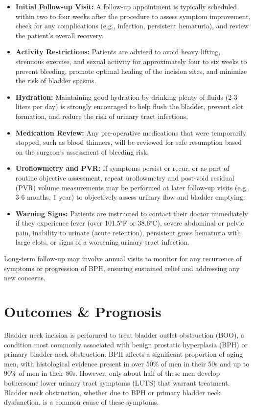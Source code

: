 \begin{itemize}
  \item \textbf{Initial Follow-up Visit:} A follow-up appointment is typically scheduled within two to four weeks after the procedure to assess symptom improvement, check for any complications (e.g., infection, persistent hematuria), and review the patient's overall recovery.
  
  \item \textbf{Activity Restrictions:} Patients are advised to avoid heavy lifting, strenuous exercise, and sexual activity for approximately four to six weeks to prevent bleeding, promote optimal healing of the incision sites, and minimize the risk of bladder spasms.
  
  \item \textbf{Hydration:} Maintaining good hydration by drinking plenty of fluids (2-3 liters per day) is strongly encouraged to help flush the bladder, prevent clot formation, and reduce the risk of urinary tract infections.
  
  \item \textbf{Medication Review:} Any pre-operative medications that were temporarily stopped, such as blood thinners, will be reviewed for safe resumption based on the surgeon's assessment of bleeding risk.
  
  \item \textbf{Uroflowmetry and PVR:} If symptoms persist or recur, or as part of routine objective assessment, repeat uroflowmetry and post-void residual (PVR) volume measurements may be performed at later follow-up visits (e.g., 3-6 months, 1 year) to objectively assess urinary flow and bladder emptying.
  
  \item \textbf{Warning Signs:} Patients are instructed to contact their doctor immediately if they experience fever (over 101.5$^{\circ}$F or 38.6$^{\circ}$C), severe abdominal or pelvic pain, inability to urinate (acute retention), persistent gross hematuria with large clots, or signs of a worsening urinary tract infection.
\end{itemize}

Long-term follow-up may involve annual visits to monitor for any recurrence of symptoms or progression of BPH, ensuring sustained relief and addressing any new concerns.

\section*{Outcomes \& Prognosis}
Bladder neck incision is performed to treat bladder outlet obstruction (BOO), a condition most commonly associated with benign prostatic hyperplasia (BPH) or primary bladder neck obstruction. BPH affects a significant proportion of aging men, with histological evidence present in over 50\% of men in their 50s and up to 90\% of men in their 80s. However, only about half of these men develop bothersome lower urinary tract symptoms (LUTS) that warrant treatment. Bladder neck obstruction, whether due to BPH or primary bladder neck dysfunction, is a common cause of these symptoms.

